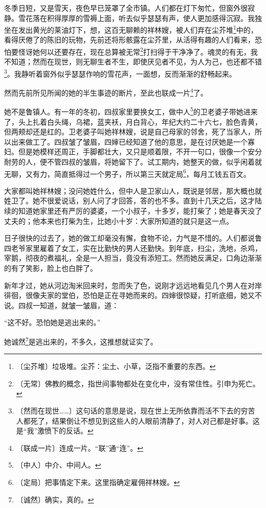 \documentclass[12pt,UTF-8,openany]{ctexbook}
\begin{document}
\begin{normalsize}
    冬季日短，又是雪天，夜色早已笼罩了全市镇。人们都在灯下匆忙，但窗外很寂静。雪花落在积得厚厚的雪褥上面，听去似乎瑟瑟有声，使人更加感得沉寂。我独坐在发出黄光的莱油灯下，想，这百无聊赖的祥林嫂，被人们弃在尘芥堆\footnote{〔尘芥堆〕垃圾堆。尘芥：尘土、小草，泛指不重要的东西。}中的，看得厌倦了的陈旧的玩物，先前还将形骸露在尘芥里，从活得有趣的人们看来，恐怕要怪讶她何以还要存在，现在总算被无常\footnote{〔无常〕佛教的概念，指世间事物都处在变化中，没有常住性。引申为死亡。}打扫得于干净净了。魂灵的有无，我不知道；然而在现世，则无聊生者不生，即使厌见者不见，为人为己，也还都不错\footnote{〔然而在现世……〕这句话的意思是说，现在世上无所依靠而活不下去的穷苦人都死了，结果倒让不想见到这些人的人眼前清静了，对人对己都是好事。这是“我”激愤下的反话。}。我静听着窗外似乎瑟瑟作响的雪花声，一面想，反而渐渐的舒畅起来。
    
    然而先前所见所闻的她的半生事迹的断片，至此也联成一片\footnote{〔联成一片〕连成一片。“联”通“连”。}了。
    
    她不是鲁镇人。有一年的冬初，四叔家里要换女工，做中人\footnote{〔中人〕中介、中间人。}的卫老婆子带她进来了，头上扎着白头绳，乌裙，蓝夹袄，月白背心，年纪大约二十六七，脸色青黄，但两颊却还是红的。卫老婆子叫她祥林嫂，说是自己母家的邻舍，死了当家人，所以出来做工了。四叔皱了皱眉，四婶已经知道了他的意思，是在讨厌她是一个寡妇。但是她模样还周正，手脚都壮大，又只是顺着限，不开一句口，很像一个安分耐劳的人，便不管四叔的皱眉，将她留下了。试工期内，她整天的做，似乎闲着就无聊，又有力，简直抵得过一个男子，所以第三天就定局\footnote{〔定局〕把事情定下来。这里指确定雇佣祥林嫂。}，每月工钱五百文。
    
    大家都叫她祥林嫂；没问她姓什么，但中人是卫家山人，既说是邻居，那大概也就姓卫了。她不很爱说话，别人问了才回答，答的也不多。直到十几天之后，这才陆续的知道她家里还有严厉的婆婆，一个小叔子，十多岁，能打柴了；她是春天没了丈夫的；他本来也打柴为生，比她小十岁：大家所知道的就只是这一点。
    
    日子很快的过去了，她的做工却毫没有懈，食物不论，力气是不惜的。人们都说鲁四老爷家里雇着了女工，实在比勤快的男人还勤快。到年底，扫尘，洗地，杀鸡，宰鹅，彻夜的煮福礼，全是一人担当，竟没有添短工。然而她反满足，口角边渐渐的有了笑影，脸上也白胖了。
    
    新年才过，她从河边淘米回来时，忽而失了色，说刚才远远地看见几个男人在对岸徘徊，很像夫家的堂伯，恐怕是正在寻她而来的。四婶很惊疑，打听底细，她又不说。四叔一知道，就皱一皱眉，道：
    
    “这不好。恐怕她是逃出来的。”
    
    她诚然\footnote{〔诚然〕确实，真的。}是逃出来的，不多久，这推想就证实了。
    

\end{normalsize}
\end{document}
